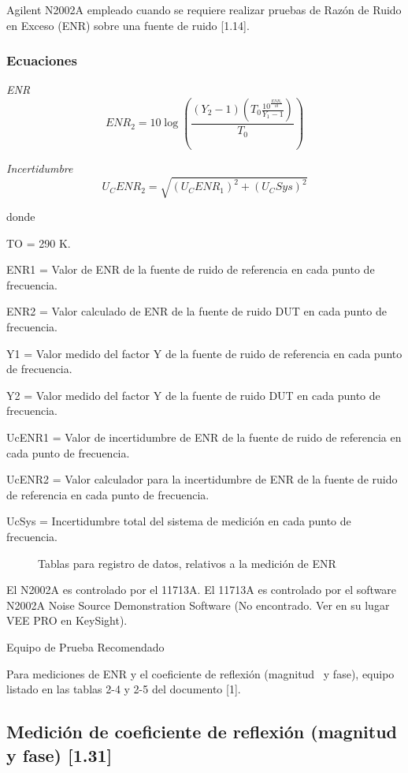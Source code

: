 Agilent N2002A empleado cuando se requiere realizar pruebas de Razón de Ruido en Exceso (ENR) sobre una fuente de ruido [1.14]. 

\subsubsection{Ecuaciones}
\emph{ENR}
\begin{equation}
	ENR_2 = 10\log\left(\frac{\left(Y_2-1\right)\left(T_0\frac{10^\frac{ENR_1}{10}}{Y_1-1}\right)}{T_0}\right)
\end{equation}

\emph{Incertidumbre}
\begin{equation}
	U_{C}ENR_2=\sqrt{(U_{C}ENR_1)^2+(U_{C}Sys)^2}
\end{equation}

donde

TO = 290 K.

ENR1 = Valor de ENR de la fuente de ruido de referencia en cada punto de frecuencia.

ENR2 = Valor calculado de ENR de la fuente de ruido DUT en cada punto de frecuencia.

Y1 = Valor medido del factor Y de la fuente de ruido de referencia en cada punto de frecuencia.

Y2 = Valor medido del factor Y de la fuente de ruido DUT en cada punto de frecuencia.

UcENR1 = Valor de incertidumbre de ENR de la fuente de ruido de referencia en cada punto de frecuencia.

UcENR2 = Valor calculador para la incertidumbre de ENR de la fuente de ruido de referencia en cada punto de frecuencia.

UcSys = Incertidumbre total del sistema de medición en cada punto de frecuencia.

	
\begin{figure}[h!]
\centering
 Tablas para registro
	de datos, relativos a la medición de ENR
\end{figure}

El N2002A es controlado por el 11713A. El 11713A es controlado por el software N2002A Noise Source Demonstration Software (No encontrado. Ver en su lugar VEE PRO en KeySight).

Equipo de Prueba Recomendado

Para mediciones de ENR y el coeficiente de reflexión (magnitud \ y fase), equipo listado en las tablas 2-4 y 2-5 del
documento [1].		

\subsection{Medición de coeficiente de reflexión (magnitud y fase) [1.31]}
